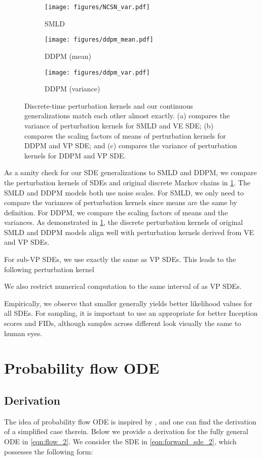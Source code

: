 \documentclass{article} \usepackage{iclr2021_conference,times}
\begin{document}
\begin{figure}
    \centering
    \begin{subfigure}{0.333\linewidth}
        \texttt{[image: figures/NCSN\_var.pdf]}\caption{SMLD}
    \end{subfigure}
    \begin{subfigure}{0.32\linewidth}
        \texttt{[image: figures/ddpm\_mean.pdf]}\caption{DDPM (mean)}
    \end{subfigure}
    \begin{subfigure}{0.32\linewidth}
        \texttt{[image: figures/ddpm\_var.pdf]}
        \caption{DDPM (variance)}
    \end{subfigure}
    \caption{Discrete-time perturbation kernels and our continuous generalizations match each other almost exactly. (a) compares the variance of perturbation kernels for SMLD and VE SDE; (b) compares the scaling factors of means of perturbation kernels for DDPM and VP SDE; and (c) compares the variance of perturbation kernels for DDPM and VP SDE.}
    \label{fig:discretization}
\end{figure}
As a sanity check for our SDE generalizations to SMLD and DDPM, we compare the perturbation kernels of SDEs and original discrete Markov chains in \cref{fig:discretization}. The SMLD and DDPM models both use  noise scales. For SMLD, we only need to compare the variances of perturbation kernels since means are the same by definition. For DDPM, we compare the scaling factors of means and the variances. As demonstrated in \cref{fig:discretization}, the discrete perturbation kernels of original SMLD and DDPM models align well with perturbation kernels derived from VE and VP SDEs.

For sub-VP SDEs, we use exactly the same  as VP SDEs. This leads to the following perturbation kernel

We also restrict numerical computation to the same interval of  as VP SDEs.

Empirically, we observe that smaller  generally yields better likelihood values for all SDEs. For sampling, it is important to use an appropriate  for better Inception scores and FIDs, although samples across different  look visually the same to human eyes.

\section{Probability flow ODE}\label{app:prob_flow_ode}
\subsection{Derivation}\label{app:prob_flow_derive}
The idea of probability flow ODE is inspired by \citet{maoutsa2020interacting}, and one can find the derivation of a simplified case therein. Below we provide a derivation for the fully general ODE in \cref{eqn:flow_2}. We consider the SDE in \cref{eqn:forward_sde_2}, which possesses the following form:
\end{document}
